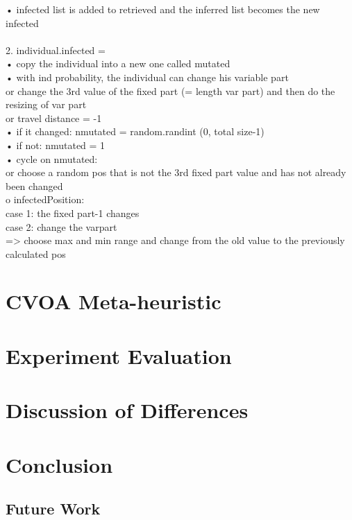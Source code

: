 \documentclass[letterpaper]{article}%
\begin{document}
• infected list is added to retrieved and the inferred list becomes the new infected\\
\\
2. individual.infected =\\
• copy the individual into a new one called mutated\\
• with ind probability, the individual can change his variable part\\
or change the 3rd value of the fixed part (= length var part) and then do the resizing of var part\\
or travel distance = -1\\
• if it changed: nmutated = random.randint (0, total size-1)\\
• if not: nmutated = 1\\
• cycle on nmutated:\\
or choose a random pos that is not the 3rd fixed part value and has not already been changed\\
o infectedPosition:\\
case 1: the fixed part-1 changes\\
case 2: change the varpart\\
=> choose max and min range and change from the old value to the previously calculated pos\\

\section{CVOA Meta-heuristic}

\section{Experiment Evaluation}

\section{Discussion of Differences}

\section{Conclusion}

\subsection{Future Work}

\printbibliography
\end{document}

